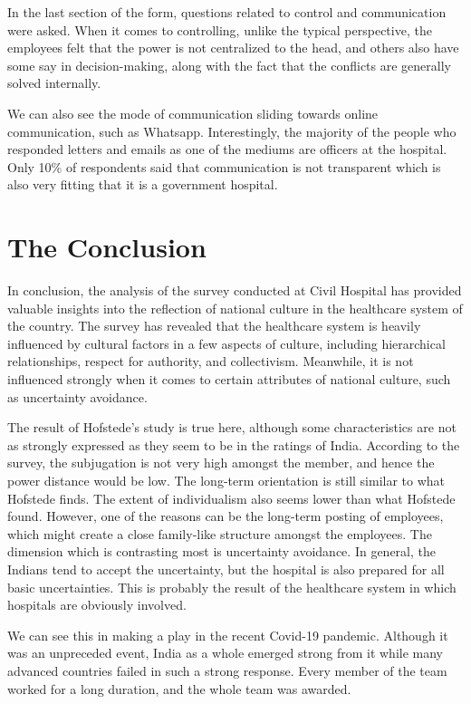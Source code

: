 \documentclass{article}
\begin{document}
In the last section of the form, questions related to control and communication were asked. When it comes to controlling, unlike the typical perspective, the employees felt that the power is not centralized to the head, and others also have some say in decision-making, along with the fact that the conflicts are generally solved internally.

We can also see the mode of communication sliding towards online communication, such as Whatsapp. Interestingly, the majority of the people who responded letters and emails as one of the mediums are officers at the hospital. Only 10\% of respondents said that communication is not transparent which is also very fitting that it is a government hospital.

\section{The Conclusion}

In conclusion, the analysis of the survey conducted at Civil Hospital has provided valuable insights into the reflection of national culture in the healthcare system of the country. The survey has revealed that the healthcare system is heavily influenced by cultural factors in a few aspects of culture, including hierarchical relationships, respect for authority, and collectivism. Meanwhile, it is not influenced strongly when it comes to certain attributes of national culture, such as uncertainty avoidance.

The result of Hofstede's study is true here, although some characteristics are not as strongly expressed as they seem to be in the ratings of India. According to the survey, the subjugation is not very high amongst the member, and hence the power distance would be low. The long-term orientation is still similar to what Hofstede finds. The extent of individualism also seems lower than what Hofstede found. However, one of the reasons can be the long-term posting of employees, which might create a close family-like structure amongst the employees. The dimension which is contrasting most is uncertainty avoidance. In general, the Indians tend to accept the uncertainty, but the hospital is also prepared for all basic uncertainties. This is probably the result of the healthcare system in which hospitals are obviously involved.

We can see this in making a play in the recent Covid-19 pandemic. Although it was an unpreceded event, India as a whole emerged strong from it while many advanced countries failed in such a strong response. Every member of the team worked for a long duration, and the whole team was awarded.
\end{document}
